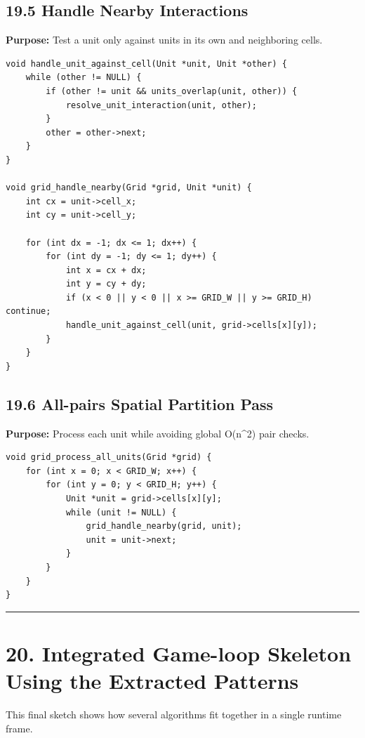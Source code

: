 \documentclass[10pt,letterpaper]{article}
\begin{document}
\subsection{19.5 Handle Nearby Interactions}

\textbf{Purpose:} Test a unit only against units in its own and neighboring cells.

\begin{verbatim}
void handle_unit_against_cell(Unit *unit, Unit *other) {
    while (other != NULL) {
        if (other != unit && units_overlap(unit, other)) {
            resolve_unit_interaction(unit, other);
        }
        other = other->next;
    }
}

void grid_handle_nearby(Grid *grid, Unit *unit) {
    int cx = unit->cell_x;
    int cy = unit->cell_y;

    for (int dx = -1; dx <= 1; dx++) {
        for (int dy = -1; dy <= 1; dy++) {
            int x = cx + dx;
            int y = cy + dy;
            if (x < 0 || y < 0 || x >= GRID_W || y >= GRID_H) continue;
            handle_unit_against_cell(unit, grid->cells[x][y]);
        }
    }
}
\end{verbatim}

\subsection{19.6 All-pairs Spatial Partition Pass}

\textbf{Purpose:} Process each unit while avoiding global O(n\textasciicircum{}2) pair checks.

\begin{verbatim}
void grid_process_all_units(Grid *grid) {
    for (int x = 0; x < GRID_W; x++) {
        for (int y = 0; y < GRID_H; y++) {
            Unit *unit = grid->cells[x][y];
            while (unit != NULL) {
                grid_handle_nearby(grid, unit);
                unit = unit->next;
            }
        }
    }
}
\end{verbatim}

\medskip\hrule\medskip

\clearpage
\section{20. Integrated Game-loop Skeleton Using the Extracted Patterns}

This final sketch shows how several algorithms fit together in a single runtime frame.
\end{document}
